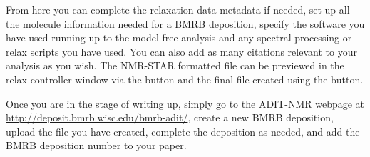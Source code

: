From here you can complete the relaxation data metadata if needed, set up all the molecule information needed for a BMRB deposition, specify the software you have used running up to the model-free analysis and any spectral processing or relax scripts you have used.
You can also add as many citations relevant to your analysis as you wish.
The NMR-STAR formatted file can be previewed in the relax controller window via the  button and the final file created using the  button.

Once you are in the stage of writing up, simply go to the ADIT-NMR webpage at \href{http://deposit.bmrb.wisc.edu/bmrb-adit/}{http://deposit.bmrb.wisc.edu/bmrb-adit/},  create a new BMRB deposition, upload the file you have created, complete the deposition as needed, and add the BMRB deposition number to your paper.

